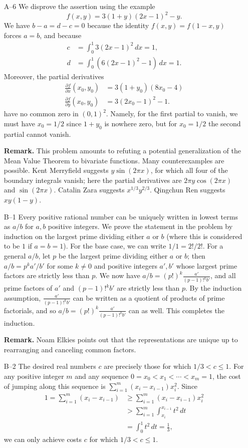 \documentclass[amssymb,twocolumn,pra,10pt,aps]{revtex4-1}
\begin{document}
\begin{itemize}
\item[A--6]
We disprove the assertion using the example
\[
f(x,y) = 3(1 + y)(2x-1)^2 -y.
\]
We have $b-a = d-c = 0$ because the identity $f(x,y) = f(1-x,y)$ forces $a=b$,
and because
\begin{align*}
c &= \int_0^1 3(2x-1)^2\,dx = 1, \\
d &= \int_0^1 (6(2x-1)^2-1)\,dx = 1.
\end{align*}
Moreover, the partial derivatives
\begin{align*}
 \frac{\partial f}{\partial x}(x_0,y_0) &= 3(1+y_0)(8x_0-4) \\
\frac{\partial f}{\partial y}(x_0,y_0) &= 3(2x_0-1)^2-1.
\end{align*}
have no common zero in $(0,1)^2$. Namely,
for the first partial to vanish, we must have $x_0 = 1/2$ since
$1 + y_0$ is nowhere zero, but for $x_0 = 1/2$
the second partial cannot vanish.

\textbf{Remark.}
This problem amounts to refuting a potential generalization of the Mean Value Theorem to bivariate
functions. Many counterexamples are possible. Kent Merryfield suggests
$y \sin(2 \pi x)$, for which all four of the boundary integrals vanish;
here the partial derivatives are $2\pi y \cos (2 \pi x)$ and $\sin (2 \pi x)$.
Catalin Zara suggests $x^{1/3} y^{2/3}$. Qingchun Ren suggests $xy(1-y)$.

\item[B--1]
Every positive rational number can be uniquely written in lowest terms
as $a/b$ for $a,b$ positive integers. We prove the statement in the
problem by induction on the largest prime dividing either $a$ or $b$
(where this is considered to be $1$ if $a=b=1$). For the base case, we
can write $1/1 = 2!/2!$. For a general $a/b$, let $p$ be the largest
prime dividing either $a$ or $b$; then $a/b = p^k a'/b'$ for some $k\neq
0$ and positive integers $a',b'$ whose largest prime factors are
strictly less than $p$. We now have $a/b = (p!)^k \frac{a'}{(p-1)!^k b'}$,
and all prime factors of $a'$ and $(p-1)!^k b'$ are strictly less than $p$.
By the induction assumption, $\frac{a'}{(p-1)!^k b'}$ can be written as a
quotient of products of prime factorials, and so $a/b = (p!)^k
\frac{a'}{(p-1)!^k b'}$ can as well. This completes the induction.

\textbf{Remark.} Noam Elkies points out that the representations are unique
up to rearranging and canceling common factors.

\item[B--2]
The desired real numbers $c$ are precisely those for which $1/3 < c \leq 1$.
For any positive integer $m$ and any
sequence $0 = x_0 < x_1 < \cdots < x_m = 1$,
the cost of jumping along this sequence is
$\sum_{i=1}^m (x_i - x_{i-1})x_i^2$. Since
\begin{align*}
1 = \sum_{i=1}^m (x_i - x_{i-1}) &\geq \sum_{i=1}^m (x_i - x_{i-1})x_i^2 \\
&> \sum_{i=1}^m \int_{x_i}^{x_{i-1}} t^2\,dt \\
&= \int_0^1 t^2\,dt = \frac{1}{3},
\end{align*}
we can only achieve costs $c$ for which $1/3 < c \leq 1$.


\end{itemize}
\end{document}
